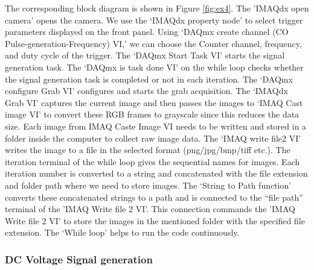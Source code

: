 \documentclass[journal=jacsat,manuscript=article]{achemso}
\begin{document}
The corresponding block diagram is shown in Figure \ref{fig:ex4}. 
The 'IMAQdx open camera' opens the camera. We use the
‘IMAQdx property node’ to select trigger parameters displayed on the
front panel. Using ‘DAQmx create channel (CO
Pulse-generation-Frequency) VI,’ we can choose the Counter channel,
frequency, and duty cycle of the trigger. The ‘DAQmx Start Task VI’
starts the signal generation task.  The ‘DAQmx is task done VI’ on the
while loop checks whether the signal generation task is completed or
not in each iteration. The ‘DAQmx configure Grab VI’ configures and
starts the grab acquisition. The ‘IMAQdx Grab VI’ captures the current
image and then passes the images to ‘IMAQ Cast image VI’ to convert
these RGB frames to grayscale since this reduces the data size. Each
image from IMAQ Caste Image VI needs to be written and stored in a
folder inside the computer to collect raw image data. The ‘IMAQ write
file2 VI’ writes the image to a file in the selected format
(png/jpg/bmp/tiff etc.). The iteration terminal of the while loop
gives the sequential names for images. Each iteration number is
converted to a string and concatenated with the file extension and
folder path where we need to store images. The ‘String to Path
function’ converts these concatenated strings to a path and is
connected to the “file path” terminal of the 'IMAQ Write file 2
VI'. This connection commands the 'IMAQ Write file 2 VI' to store the
images in the mentioned folder with the specified file extension. The
‘While loop’ helps to run the code continuously.


\subsubsection{DC Voltage Signal generation}
\end{document}
